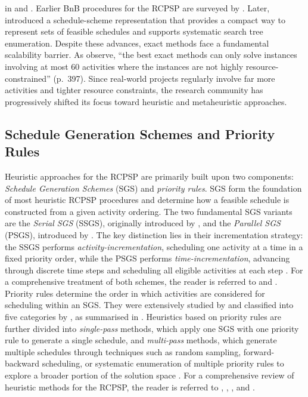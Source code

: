 in \cite{Herroelen1992} and \cite{Brucker1999}. Earlier BnB procedures for the RCPSP are surveyed by \textcite{Herroelen1992}. Later, \textcite{Brucker1998} introduced a schedule-scheme representation that provides a compact way to represent sets of feasible schedules and supports systematic search tree
enumeration. Despite these advances, exact methods face a fundamental scalability barrier. As \cite{Pellerin2020} observe, ``the best exact methods can only solve instances involving at most 60 activities where
the instances are not highly resource-constrained'' (p.~397). Since real-world projects
regularly involve far more activities and tighter resource constraints, the research
community has progressively shifted its focus toward heuristic and metaheuristic
approaches.
\subsection*{Schedule Generation Schemes and Priority Rules}
Heuristic approaches for the RCPSP are primarily built upon two components:
\textit{Schedule Generation Schemes} (SGS) and \textit{priority rules}. SGS form the
foundation of most heuristic RCPSP procedures \parencite{Kolisch1999} and determine how
a feasible schedule is constructed from a given activity ordering. The two fundamental
SGS variants are the \textit{Serial SGS} (SSGS), originally introduced by
\cite{Kelley1963}, and the \textit{Parallel SGS} (PSGS), introduced by
\cite{Brooks1965}. The key distinction lies in their incrementation strategy: the SSGS
performs \textit{activity-incrementation}, scheduling one activity at a time in a fixed
priority order, while the PSGS performs \textit{time-incrementation}, advancing through
discrete time steps and scheduling all eligible activities at each step
\parencite{Kolisch1996}. For a comprehensive treatment of both schemes, the reader is
referred to \cite{Kolisch1996} and \cite{Demeulemeester2002}.
Priority rules determine the order in which activities are considered for scheduling
within an SGS. They were extensively studied by \cite{Klein2000} and classified into
five categories by \cite{lawrence1985}, as summarised in \cite{Demeulemeester2002}.
Heuristics based on priority rules are further divided into \textit{single-pass}
methods, which apply one SGS with one priority rule to generate a single schedule, and
\textit{multi-pass} methods, which generate multiple schedules through techniques such
as random sampling, forward-backward scheduling, or systematic enumeration of multiple
priority rules to explore a broader portion of the solution space
\parencite[p.~152]{Kolisch1999}. For a comprehensive review of heuristic methods for
the RCPSP, the reader is referred to \cite{Kolisch1999}, \cite{hartmann2000},
\cite{Kolisch2006a}, and \cite{issa2020}.
